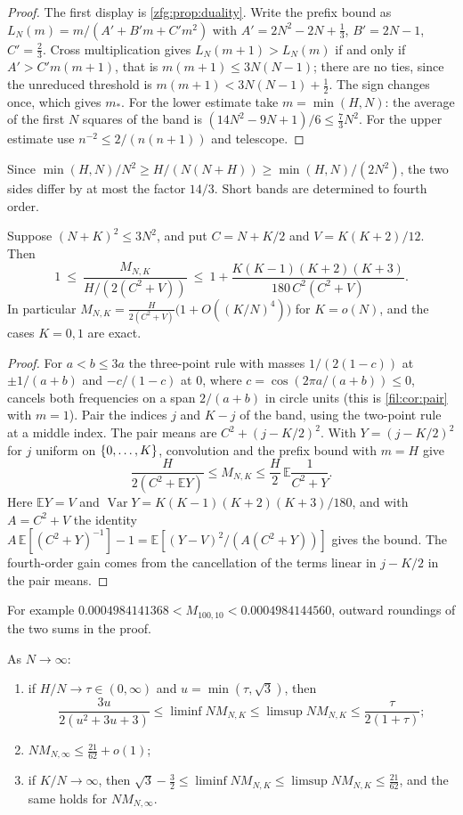 \begin{proof}
The first display is \cref{zfg:prop:duality}. Write the prefix bound as $L_N(m)=m/(A'+B'm+C'm^2)$ with
$A'=2N^2-2N+\tfrac13$, $B'=2N-1$, $C'=\tfrac23$. Cross multiplication gives $L_N(m+1)>L_N(m)$ if and only if
$A'>C'm(m+1)$, that is $m(m+1)\le3N(N-1)$; there are no ties, since the unreduced threshold is
$m(m+1)<3N(N-1)+\tfrac12$. The sign changes once, which gives $m_*$. For the lower estimate take $m=\min(H,N)$: the
average of the first $N$ squares of the band is $(14N^2-9N+1)/6\le\tfrac73N^2$. For the upper estimate use
$n^{-2}\le2/(n(n+1))$ and telescope.
\end{proof}

Since $\min(H,N)/N^2\ge H/(N(N+H))\ge\min(H,N)/(2N^2)$, the two sides differ by at most the factor $14/3$. Short bands are
determined to fourth order.

\begin{theorem}\label{zfg:thm:shortsq}
Suppose $(N+K)^2\le3N^2$, and put $C=N+K/2$ and $V=K(K+2)/12$. Then
\[
 1\ \le\ \frac{M_{N,K}}{H/(2(C^2+V))}\ \le\ 1+\frac{K(K-1)(K+2)(K+3)}{180\,C^2(C^2+V)}.
\]
In particular $M_{N,K}=\frac{H}{2(C^2+V)}\bigl(1+O((K/N)^4)\bigr)$ for $K=o(N)$, and the cases $K=0,1$ are exact.
\end{theorem}

\begin{proof}
For $a<b\le3a$ the three-point rule with masses $1/(2(1-c))$ at $\pm1/(a+b)$ and $-c/(1-c)$ at $0$, where
$c=\cos(2\pi a/(a+b))\le0$, cancels both frequencies on a span $2/(a+b)$ in circle units (this is \cref{fil:cor:pair} with
$m=1$). Pair the indices $j$ and $K-j$ of the band, using the two-point rule at a middle index. The pair means are
$C^2+(j-K/2)^2$. With $Y=(j-K/2)^2$ for $j$ uniform on $\{0,\dots,K\}$, convolution and the prefix bound with $m=H$ give
\[
 \frac H{2(C^2+\mathbb EY)}\le M_{N,K}\le\frac H2\,\mathbb E\frac1{C^2+Y}.
\]
Here $\mathbb EY=V$ and $\operatorname{Var}Y=K(K-1)(K+2)(K+3)/180$, and with $A=C^2+V$ the identity
$A\,\mathbb E[(C^2+Y)^{-1}]-1=\mathbb E[(Y-V)^2/(A(C^2+Y))]$ gives the bound. The fourth-order gain comes from the cancellation of
the terms linear in $j-K/2$ in the pair means.
\end{proof}

For example $0.0004984141368<M_{100,10}<0.0004984144560$, outward roundings of the two sums in the proof.

\begin{theorem}\label{zfg:thm:longsq}
As $N\to\infty$:
\begin{enumerate}
\item if $H/N\to\tau\in(0,\infty)$ and $u=\min(\tau,\sqrt3)$, then
\[
 \frac{3u}{2(u^2+3u+3)}\le\liminf NM_{N,K}\le\limsup NM_{N,K}\le\frac\tau{2(1+\tau)};
\]
\item $NM_{N,\infty}\le\tfrac{21}{62}+o(1)$;
\item if $K/N\to\infty$, then $\sqrt3-\tfrac32\le\liminf NM_{N,K}\le\limsup NM_{N,K}\le\tfrac{21}{62}$, and the same holds for $NM_{N,\infty}$.
\end{enumerate}
\end{theorem}

